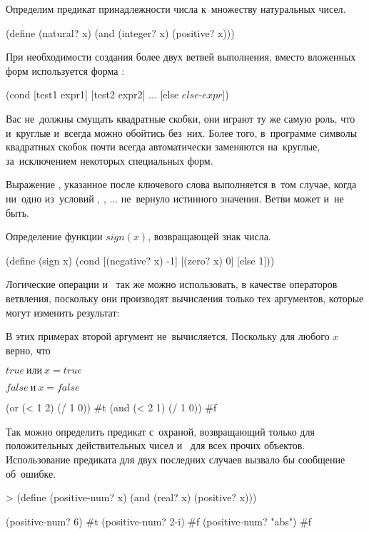 \begin{example}{Определим предикат принадлежности числа к~множеству натуральных чисел.}
\begin{ExampleCode}
(define (natural? x)
  (and (integer? x)
       (positive? x)))
\end{ExampleCode}
\end{example}

При необходимости создания более двух ветвей выполнения, вместо вложенных форм  используется форма :
\begin{SchemeCode}[]
(cond
  [test1 expr1]
  [test2 expr2]
  ...
  [else $else$-$expr$])
\end{SchemeCode}

Вас не~должны смущать квадратные скобки, они играют ту же самую роль, что и~круглые и~всегда можно обойтись без~них. Более того, в~программе \DrRacket символы квадратных скобок почти всегда автоматически заменяются на~круглые, за~исключением некоторых специальных форм.

Выражение , указанное после ключевого слова  выполняется в~том случае, когда ни~одно из~условий , , ... не~вернуло истинного значения. Ветви  может и~не быть.

\begin{example}{Определение функции $sign(x)$, возвращающей знак числа.}
\begin{ExampleCode}
(define (sign x)
  (cond
    [(negative? x) -1]
    [(zero? x) 0]
    [else 1]))
\end{ExampleCode}
\end{example}

Логические операции  и~ так же можно использовать, в качестве операторов ветвления, поскольку они производят вычисления только тех аргументов, которые могут изменить результат:

\begin{example}{%
В этих примерах второй аргумент не~вычисляется. Поскольку для любого $x$ верно, что

$true\ \text{или}\ x = true$

$false\ \text{и}\ x = false$}
\REPL
  {(or (< 1 2) (/ 1 0))}
  {\#t}
\REPL
  {(and (< 2 1) (/ 1 0))}
  {\#f}
\end{example}

\begin{example}{Так можно определить предикат с~охраной, возвращающий  только для положительных действительных чисел и~ для всех прочих объектов. Использование предиката  для двух последних случаев вызвало бы сообщение об~ошибке.}
\begin{ExampleCode}
> (define (positive-num? x)
    (and (real? x)
         (positive? x)))
\end{ExampleCode}
\REPL
  {(positive-num? 6)}
  {\#t}
\REPL
  {(positive-num? 2-i)}
  {\#f}
\REPL
  {(positive-num? "abs")}
  {\#f}
\end{example}

